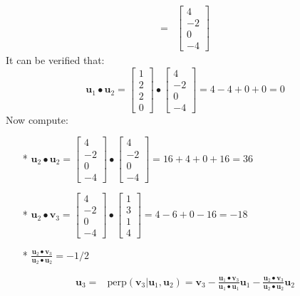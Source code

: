 \documentclass{article}
\begin{document}
\begin{description}
\begin{align*}
= & \begin{bmatrix} 4 \\ -2 \\ 0 \\ -4 \end{bmatrix} 
\end{align*}
It can be verified that:
\[\mathbf{u}_1 \bullet \mathbf{u}_2 = \begin{bmatrix} 1 \\ 2 \\ 2 \\ 0 \end{bmatrix} \bullet \begin{bmatrix} 4 \\ -2 \\ 0 \\ -4 \end{bmatrix}  = 4 - 4 + 0 + 0 = 0\]
Now compute:
\begin{itemize}
\item[*] \(\mathbf{u}_2 \bullet \mathbf{u}_2 = \begin{bmatrix} 4 \\ -2 \\ 0 \\ -4 \end{bmatrix} \bullet \begin{bmatrix} 4 \\ -2 \\ 0 \\ -4 \end{bmatrix} = 16 + 4 + 0 +16 = 36\)
\item[*] \(\mathbf{u}_2 \bullet \mathbf{v}_3 = \begin{bmatrix} 4 \\ -2 \\ 0 \\ -4 \end{bmatrix} \bullet \begin{bmatrix} 1 \\ 3 \\ 1 \\ 4 \end{bmatrix} = 4 - 6 + 0 - 16 = -18\)
\item[*] \(\frac{\mathbf{u}_2 \bullet \mathbf{v}_3}{\mathbf{u}_2 \bullet \mathbf{u}_2} = -1/2\)
\end{itemize}
\begin{align*}
\mathbf{u}_3 = & \text{perp}(\mathbf{v}_3 | \mathbf{u}_1, \mathbf{u}_2) = \mathbf{v}_3 - \frac{\mathbf{u}_1 \bullet \mathbf{v}_3}{\mathbf{u}_1 \bullet \mathbf{u}_1}\mathbf{u}_1 - \frac{\mathbf{u}_2 \bullet \mathbf{v}_3}{\mathbf{u}_2 \bullet \mathbf{u}_2}\mathbf{u}_2 

\end{align*}
\end{description}
\end{document}
